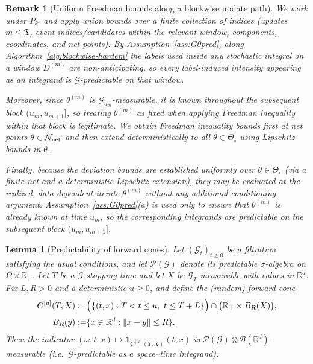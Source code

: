 \documentclass{statsoc}
\newtheorem{lemma}[lemma]{Lemma}
\newtheorem{remark}[remark]{Remark}
\newcommand{\1}{\mathbbm{1}}
\newcommand{\Tmax}{\mathfrak{T}}
\begin{document}
\begin{remark}[Uniform Freedman bounds along a blockwise update path]\label{rem:conditional-freedman}
We work under $P_{\theta^\star}$ and apply union bounds over a finite collection of indices
(updates $m\le\Tmax$, event indices/candidates within the relevant window, components, coordinates, and net points).
By Assumption~\ref{ass:G0pred}, along Algorithm~\ref{alg:blockwise-hardem} the labels used inside any stochastic integral
on a window $D^{(m)}$ are non-anticipating, so every label-induced intensity appearing as an integrand is $\mathcal G$-predictable
on that window.

Moreover, since $\theta^{(m)}$ is $\mathcal G_{u_m}$-measurable, it is known throughout the subsequent block $(u_m,u_{m+1}]$,
so treating $\theta^{(m)}$ as fixed when applying Freedman inequality within that block is legitimate.
We obtain Freedman inequality bounds first at net points $\theta\in\mathcal N_{\rm net}$ and then extend deterministically to all
$\theta\in\Theta_\circ$ using Lipschitz bounds in $\theta$.

Finally, because the deviation bounds are established uniformly over $\theta\in\Theta_\circ$ (via a finite net and a deterministic Lipschitz extension), they may be evaluated at the realized, data-dependent iterate $\theta^{(m)}$ without any additional conditioning argument. Assumption~\ref{ass:G0pred}(a) is used only to ensure that $\theta^{(m)}$ is already known at time $u_m$, so the corresponding integrands are predictable on the subsequent block $(u_m,u_{m+1}]$.
\end{remark}


\begin{lemma}[Predictability of forward cones]\label{lem:predictable-cone}
Let $(\mathcal G_t)_{t\ge 0}$ be a filtration satisfying the usual conditions, and let
$\mathcal P(\mathcal G)$ denote its predictable $\sigma$-algebra on $\Omega\times\mathbb R_+$.
Let $T$ be a $\mathcal G$-stopping time and let $X$ be $\mathcal G_T$-measurable with values in
$\mathbb R^d$. Fix $L,R>0$ and a deterministic $u\ge 0$, and define the (random) forward cone
\begin{align*}
C^{[u]}(T,X)
:=& \Bigl(\{(t,x): T<t\le u,\ t\le T+L\}\Bigr)\cap\bigl(\mathbb R_+\times B_R(X)\bigr),\\
B_R(y):=&\{x\in\mathbb R^d:\|x-y\|\le R\}.
\end{align*}
Then the indicator $(\omega,t,x)\mapsto \mathbf 1_{C^{[u]}(T,X)}(t,x)$ is
$\mathcal P(\mathcal G)\otimes \mathcal B(\mathbb R^d)$-measurable (i.e.\ $\mathcal G$-predictable
as a space--time integrand).
\end{lemma}
\end{document}
